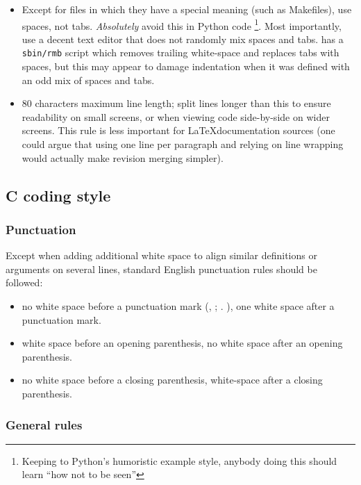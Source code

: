 \begin{itemize}
\item Except for files in which they have a special meaning (such as
      Makefiles), use spaces, not tabs. \emph{Absolutely} avoid this in
      Python code \footnote{Keeping to Python's humoristic example style,
      anybody doing this should learn ``how not to be seen''}. Most importantly,
      use a decent text editor that does not randomly mix spaces and tabs.
      \CS has a \texttt{sbin/rmb} script which removes trailing
      white-space and replaces tabs with spaces, but this may appear to damage
      indentation when it was defined with an odd mix of spaces and tabs.
\item 80 characters maximum line length; split lines longer than this
      to ensure readability on small screens, or when viewing code side-by-side
      on wider screens. This rule is less important for \LaTeX documentation
      sources (one could argue that using one line per paragraph and relying
      on line wrapping would actually make revision merging simpler). 
\end{itemize}

\subsection{C coding style}

\subsubsection{Punctuation}

Except when adding additional white space to align similar definitions
or arguments on several lines, standard English punctuation rules should be
followed:

\begin{itemize}
\item no white space before a punctuation mark (, ; . ), one white space
      after a punctuation mark.

\item white space before an opening parenthesis, no white space after an opening
      parenthesis.

\item no white space before a closing parenthesis, white-space after a closing
      parenthesis.
\end{itemize}

\subsubsection{General rules}

